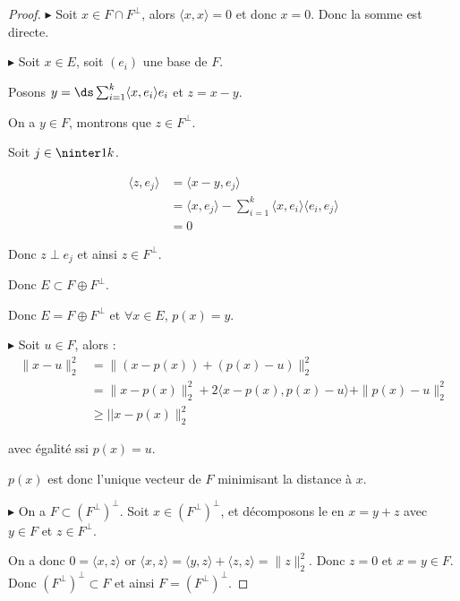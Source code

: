 \begin{proof}
    $\blacktriangleright$ Soit $x \in F \cap F^\perp$, alors $\langle x, x \rangle = 0$ et donc $x = 0$. 
    Donc la somme est directe. 

    \avspace $\blacktriangleright$ Soit $x \in E$, soit $(e_i)$ une base de $F$. 

    Posons $y = \ds \sum_{i = 1}^k \langle x, e_i \rangle e_i$ et $z = x - y$. 

    On a $y \in F$, montrons que $z \in F^\perp$. 

    Soit $j \in \ninter 1 k$. 

    \begin{align}
        \langle z, e_j \rangle & = \langle x - y, e_j \rangle \\
        & = \langle x, e_j \rangle - \sum_{i = 1}^k \langle x, e_i \rangle \langle e_i, e_j \rangle \\
        & = 0
    \end{align}

    Donc $z \perp e_j$ et ainsi $z \in F^\perp$.

    Donc $E \subset F \oplus F^\perp$.

    Donc $E = F \oplus F^\perp$ et $\forall x \in E$, $p(x) = y$. 

    \avspace $\blacktriangleright$ Soit $u \in F$, alors :
    \begin{align}
        \| x - u \|_2^2 & = \| (x - p(x)) + (p(x) - u) \|_2^2 \\
        & = \| x - p(x) \|_2^2 + 2\langle x - p(x), p(x) - u \rangle + \| p(x) - u \|_2^2 \\
        & \geqslant || x - p(x) \|_2^2
    \end{align}

    avec égalité ssi $p(x) = u$. 

    $p(x)$ est donc l'unique vecteur de $F$ minimisant la distance à $x$.

    \avspace $\blacktriangleright$ On a $F \subset (F^\perp)^\perp$. Soit $x \in (F^\perp)^\perp$,
    et décomposons le en $x = y + z$ avec $y \in F$ et $z \in F^\perp$.

    On a donc $0 = \langle x, z \rangle$ or $\langle x, z \rangle = \langle y, z \rangle + \langle z, z \rangle = \|z\|_2^2$.
    Donc $z = 0$ et $x = y \in F$. Donc $(F^\perp)^\perp \subset F$ et ainsi $F = (F^\perp)^\perp$.
\end{proof}

